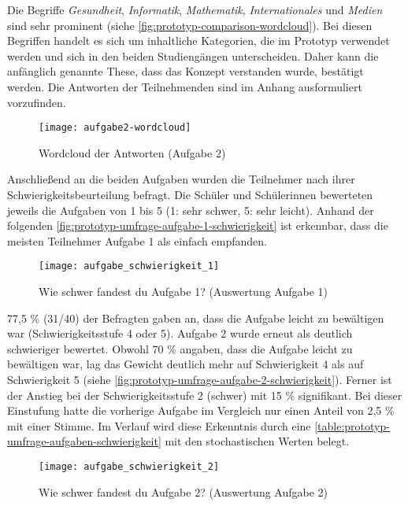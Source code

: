 Die Begriffe \textit{Gesundheit}, \textit{Informatik}, \textit{Mathematik}, \textit{Internationales} und \textit{Medien} sind sehr prominent (siehe \autoref{fig:prototyp-comparison-wordcloud}). Bei diesen Begriffen handelt es sich um inhaltliche Kategorien, die im Prototyp verwendet werden und sich in den beiden Studiengängen unterscheiden. Daher kann die anfänglich genannte These, dass das Konzept verstanden wurde, bestätigt werden. Die Antworten der Teilnehmenden sind im Anhang ausformuliert vorzufinden.

\begin{figure}[H]
    \centering
    \texttt{[image: aufgabe2-wordcloud]}
    \caption{Wordcloud der Antworten (Aufgabe 2)}
    \label{fig:prototyp-comparison-wordcloud}
\end{figure}

Anschließend an die beiden Aufgaben wurden die Teilnehmer nach ihrer Schwierigkeitsbeurteilung befragt. Die Schüler und Schülerinnen bewerteten jeweils die Aufgaben von 1 bis 5 (1: sehr schwer, 5: sehr leicht). Anhand der folgenden \autoref{fig:prototyp-umfrage-aufgabe-1-schwierigkeit} ist erkennbar, dass die meisten Teilnehmer Aufgabe 1 als einfach empfanden.

\begin{figure}[H]
    \centering
    \texttt{[image: aufgabe\_schwierigkeit\_1]}
    \caption{Wie schwer fandest du Aufgabe 1? (Auswertung Aufgabe 1)}
    \label{fig:prototyp-umfrage-aufgabe-1-schwierigkeit}
\end{figure}

77,5 \% (31/40) der Befragten gaben an, dass die Aufgabe leicht zu bewältigen war (Schwierigkeitsstufe 4 oder 5). Aufgabe 2 wurde erneut als deutlich schwieriger bewertet. Obwohl 70 \% angaben, dass die Aufgabe leicht zu bewältigen war, lag das Gewicht deutlich mehr auf Schwierigkeit 4 als auf Schwierigkeit 5 (siehe \autoref{fig:prototyp-umfrage-aufgabe-2-schwierigkeit}). Ferner ist der Anstieg bei der Schwierigkeitsstufe 2 (schwer) mit 15 \% signifikant. Bei dieser Einstufung hatte die vorherige Aufgabe im Vergleich nur einen Anteil von 2,5 \% mit einer Stimme. Im Verlauf wird diese Erkenntnis durch eine \autoref{table:prototyp-umfrage-aufgaben-schwierigkeit} mit den stochastischen Werten belegt.

\begin{figure}[H]
    \centering
    \texttt{[image: aufgabe\_schwierigkeit\_2]}
    \caption{Wie schwer fandest du Aufgabe 2? (Auswertung Aufgabe 2)}
    \label{fig:prototyp-umfrage-aufgabe-2-schwierigkeit}
\end{figure}

